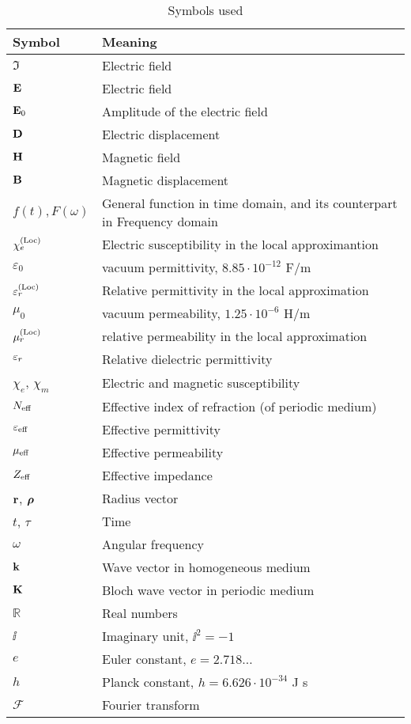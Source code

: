\begin{table}[ht]   \caption{Symbols used}  \label{tb_symbols} \centering %
\begin{tabular}{ll}
 \toprule
Symbol & Meaning	\\
 \hline
$\Im$ 		& Electric field\\
$\mathbf{E}$ 		& Electric field\\
$\mathbf{E}_0$ 		& Amplitude of the electric field\\
$\mathbf{D}$ 		& Electric displacement\\
$\mathbf{H}$ 		& Magnetic field\\
$\mathbf{B}$ 		& Magnetic displacement\\
$f(t), F(\omega)$ & General function in time domain, and its counterpart in Frequency domain \\
$\chi_e^{\rm(Loc)}$ & Electric susceptibility in the local approximantion \\
$\varepsilon_0$ &vacuum permittivity, $8.85\cdot10^{-12}$ F/m\\
$\varepsilon^{\rm(Loc)}_r$ &Relative permittivity in the local approximation\\
$\mu_0$		&vacuum permeability, $1.25\cdot10^{-6}$ H/m \\
$\mu^{\rm(Loc)}_r$ &relative permeability in the local approximation\\

${\varepsilon_r}$ 	& Relative dielectric permittivity\\
$\chi_e$, $\chi_m$ 	& Electric and magnetic susceptibility\\
$N_{\text{eff} }$ 	& Effective index of refraction (of periodic medium)\\
$\varepsilon_{\text{eff} }$ 	& Effective permittivity\\
$\mu_{\text{eff} }$ 	& Effective permeability\\
$Z_{\text{eff} }$ 	& Effective impedance\\
${\mathbf{r}}$, $\boldsymbol{\rho}$ 		& Radius vector\\
$t$, $\tau$ 		& Time\\
$\omega$ 	& Angular frequency\\
${\mathbf{k}}$ 		& Wave vector in homogeneous medium\\
${\mathbf{K}}$ 		& Bloch wave vector in periodic medium\\

$\mathbb{R}$		& Real numbers\\
$\ii$		& Imaginary unit, $\ii^2 = -1$\\
$e$ 		& Euler constant, $e = 2.718\ldots$\\
$h$ 		& Planck constant, $h = 6.626\cdot 10^{-34}$ J s\\
$\mathcal F$ 		& Fourier transform\\

 \bottomrule
 \end{tabular} \end{table}

